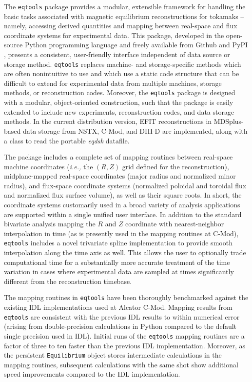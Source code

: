 \documentclass[12pt,floatfix,showpacs]{revtex4-1}
\newcommand{\ie}{\emph{i.e., }}
\newcommand{\eqtools}{\texttt{eqtools}\xspace}
\begin{document}
The \eqtools package provides a modular, extensible framework for handling the basic tasks associated with magnetic equilibrium reconstructions for tokamaks -- namely, accessing derived quantities and mapping between real-space and flux coordinate systems for experimental data.
This package, developed in the open-source Python programming language and freely available from Github and PyPI \cite{eqtools_pypi,*eqtools_git,*eqtools_readthedocs}, presents a consistent, user-friendly interface independent of data source or storage method.
\eqtools replaces machine- and storage-specific methods which are often nonintuitive to use and which use a static code structure that can be difficult to extend for experimental data from multiple machines, storage methods, or reconstruction codes.
Moreover, the \eqtools package is designed with a modular, object-oriented construction, such that the package is easily extended to include new experiments, reconstruction codes, and data storage methods.
In the current distribution version, EFIT reconstructions \cite{Lao1985} in MDSplus-based data storage from NSTX, C-Mod, and DIII-D are implemented, along with a class to read the portable \emph{eqdsk} datafile.  

The package includes a complete set of mapping routines between real-space machine coordinates (\ie the $(R, Z)$ grid defined for the reconstruction), midplane-mapped real-space coordinates (major radius and normalized minor radius), and flux-space coordinate systems (normalized poloidal and toroidal flux and normalized flux surface volume), as well as their square roots.
In short, the coordinate systems customarily used in a broad variety of analysis applications are supported within a single unified user interface.  
In addition to the standard bivariate analysis mapping the $R$ and $Z$ coordinate with nearest-neighbor interpolation in time (as is presently used in the mapping routines at C-Mod), \eqtools includes a novel trivariate spline implementation to provide smooth interpolation along the time axis as well.  
This allows the user to optionally trade computational time for a substantially more accurate treatment of the time variation in cases where experimental data are sampled at times significantly different from the reconstruction timebase.

The mapping routines in \eqtools have been thoroughly benchmarked against the existing IDL implementations used at Alcator C-Mod.  
Mapping results from \eqtools are consistent with the previous IDL results to within numerical error (arising from double-precision calculations in Python compared to the default single precision used in IDL).
Initial runs of the \eqtools mapping routines are a factor of three to ten faster than the previous IDL implementation.
Moreover, as the persistent \verb|Equilibrium| object stores intermediate calculations in the mapping routines, subsequent calculations with the same shot show additional speed improvements compared to the IDL implementation.
\end{document}

